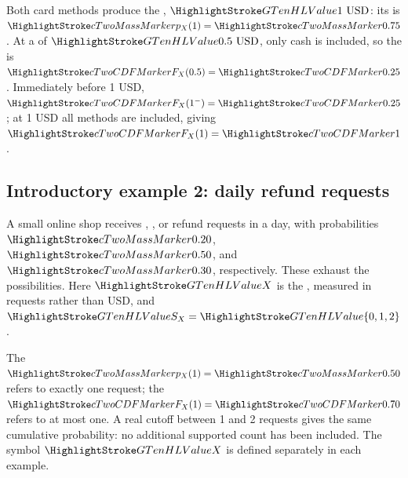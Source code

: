 Both card methods produce the , $\cTwoValue{1\text{ USD}}$: its  is $\cTwoMassHL{p_X(1)}=\cTwoMassHL{0.75}$. At a  of $\cTwoValue{0.5\text{ USD}}$, only cash is included, so the  is $\cTwoCDFHL{F_X(0.5)}=\cTwoCDFHL{0.25}$. Immediately before 1 USD, $\cTwoCDFHL{F_X(1^-)}=\cTwoCDFHL{0.25}$; at 1 USD all methods are included, giving $\cTwoCDFHL{F_X(1)}=\cTwoCDFHL{1}$.

\subsection{Introductory example 2: daily refund requests}\label{ex:refund-intro}
A small online shop receives , , or  refund requests in a day, with probabilities $\cTwoMassHL{0.20}$, $\cTwoMassHL{0.50}$, and $\cTwoMassHL{0.30}$, respectively. These exhaust the possibilities. Here $\cTwoValue{X}$ is the , measured in requests rather than USD, and $\cTwoValue{S_X}=\cTwoValue{\{0,1,2\}}$.

The  $\cTwoMassHL{p_X(1)}=\cTwoMassHL{0.50}$ refers to exactly one request; the  $\cTwoCDFHL{F_X(1)}=\cTwoCDFHL{0.70}$ refers to at most one. A real cutoff between 1 and 2 requests gives the same cumulative probability: no additional supported count has been included. The symbol $\cTwoValue{X}$ is defined separately in each example.

\clearpage
